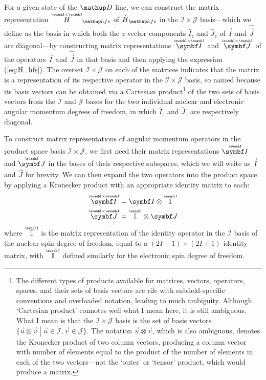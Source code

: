 For a given state of the $\up{D}$ line, we can construct the matrix representation $\oversetIJ H_\up{hfs}$ of $\hat H_\up{hfs}$ in the $\mathcal{I}\times\mathcal{J}$ basis---which we define as the basis in which both the $z$ vector components $\hat{I}_z$ and $\hat{J}_z$ of $\hat{\vec I}$ and $\hat{\vec J}$ are diagonal---by constructing matrix representations $\oversetIJ{\vec I}$ and $\oversetIJ{\vec J}$ of the operators $\hat{\vec I}$ and $\hat{\vec J}$ in that basis and then applying the expression (\ref{eq:H_hfs}). The overset ${\mathcal{I} \times \mathcal{J}}$ on each of the matrices indicates that the matrix is a representation of its respective operator in the ${\mathcal{I} \times \mathcal{J}}$ basis, so named because its basis vectors can be obtained via a Cartesian product\footnote{The different types of products available for matrices, vectors, operators, spaces, and their sets of basis vectors are rife with subfield-specific conventions and overloaded notation, leading to much ambiguity. Although `Cartesian product' connotes well what I mean here, it is still ambiguous. What I mean is that the ${\mathcal{I} \times \mathcal{J}}$ basis is the set of basis vectors $\{\left.\vec u \otimes \vec v\ \right|\ \vec u \in \mathcal{I}, \vec v\in\mathcal{J}\}$. The notation $\vec u \otimes \vec v$, which is also ambiguous, denotes the Kronecker product of two column vectors, producing a column vector with number of elements equal to the product of the number of elements in each of the two vectors---not the `outer' or `tensor' product, which would produce a matrix.} of the two sets of basis vectors from the $\mathcal{I}$ and $\mathcal{J}$ bases for the two individual nuclear and electronic angular momentum degrees of freedom, in which $\hat{I}_z$ and $\hat{J}_z$ are respectively diagonal.

To construct matrix representations of angular momentum operators in the product space basis ${\mathcal{I} \times \mathcal{J}}$, we first need their matrix representations $\oversetI{\vec I}$ and $\oversetJ{\vec J}$ in the bases of their respective subspaces, which we will write as $\vec I$ and $\vec J$ for brevity. We can then expand the two operators into the product space by applying a Kronecker product with an appropriate identity matrix to each:
\begin{align}\label{eq:kronecker_identity_I}
\oversetIJ{\vec I}
 &= \vec I \otimes \oversetJ{\mathbb{I}}\\
\label{eq:kronecker_identity_J}
\oversetIJ{\vec J}
&= \oversetI{\mathbb{I}} \otimes \vec J
\end{align}
where $\oversetI{\mathbb{I}}$ is the matrix representation of the identity operator in the $\mathcal{I}$ basis of the nuclear spin degree of freedom, equal to a $(2I+1)\times(2I+1)$ identity matrix, with $\oversetJ{\mathbb{I}}$ defined similarly for the electronic spin degree of freedom.

